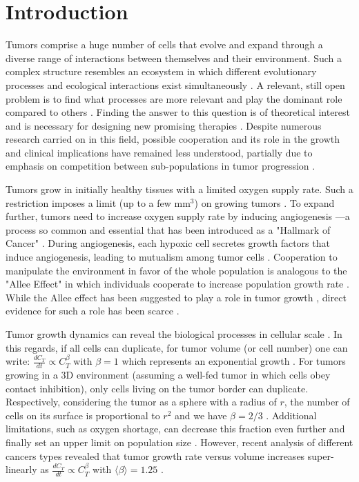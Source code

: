 \documentclass[aps,prl, superscriptaddress,groupedaddress]{revtex4}  %
\begin{document}
	\section{Introduction}
	Tumors comprise a huge number of cells that evolve and expand through a diverse range of interactions between themselves and their environment. Such a complex structure resembles an ecosystem in which different evolutionary processes and ecological interactions exist simultaneously \cite{korolev2014turning}. A relevant, still open problem is to find what processes are more relevant and play the dominant role compared to others \cite{turajlic2019resolving}. Finding the answer to this question is of theoretical interest and is necessary for designing new promising therapies \cite{bozic2013evolutionary, gatenby2020integrating}. Despite numerous research carried on in this field, possible cooperation and its role in the growth and clinical implications have remained less understood, partially due to emphasis on competition between sub-populations in tumor progression \cite{wang2014tumor, parker2020cell, zahir2020characterizing, lakatos2020evolutionary, williams2020measuring}.
	
	Tumors grow in initially healthy tissues with a limited oxygen supply rate. Such a restriction imposes a limit (up to a few mm$^3$) on growing tumors \cite{carmeliet2000angiogenesis}. To expand further, tumors need to increase oxygen supply rate by inducing angiogenesis  ---a process so common and essential that has been introduced as a "Hallmark of Cancer" \cite{hanahan2000hallmarks, hanahan2011hallmarks}. During angiogenesis, each hypoxic cell secretes growth factors that induce angiogenesis, leading to mutualism among tumor cells \cite{archetti2019cooperation}. Cooperation to manipulate the environment in favor of the whole population is analogous to the "Allee Effect" in which individuals cooperate to increase population growth rate \cite{allee1932studies}. While the Allee effect has been suggested to play a role in tumor growth \cite{korolev2014turning, bottger2015emerging, brown2016aggregation, gatenby2019first}, direct evidence for such a role has been scarce \cite{johnson2019cancer}.
	
	Tumor growth dynamics can reveal the biological processes in cellular scale \cite{rodriguez2013tumor, west2019cellular}. In this regards, if all cells can duplicate, for tumor volume (or cell number) one can write: $\frac{dC_T}{dt} \propto C_T^\beta$ with $\beta=1$ which represents an exponential growth \cite{collins1956observation}. For tumors growing in a 3D environment (assuming a well-fed tumor in which cells obey contact inhibition), only cells living on the tumor border can duplicate. Respectively, considering the tumor as a sphere with a radius of $r$, the number of cells on its surface is proportional to $r^2$ and we have $\beta= 2/3$ \cite{mayneord1932law}. Additional limitations, such as oxygen shortage, can decrease this fraction even further and finally set an upper limit on population size \cite{west2001general}. However, recent analysis of different cancers types revealed that tumor growth rate versus volume  increases super-linearly as $\frac{d C_T}{d t} \propto C_T^\beta$ with  $\langle \beta \rangle=1.25$ \cite{Victor2020superlinear}.  
	
\end{document}
